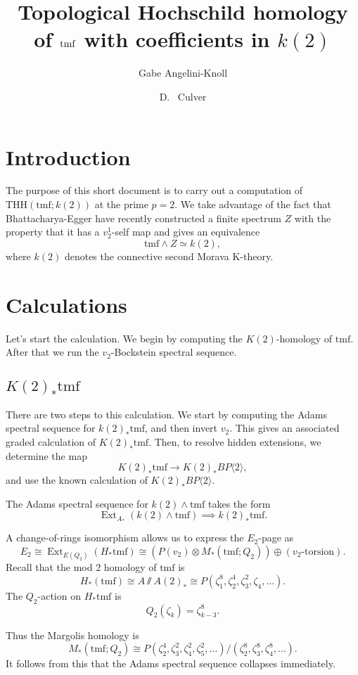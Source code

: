 \documentclass[12pt]{amsart}
\author{Gabe Angelini-Knoll}\address{Michigan State University, Lansing}
\author{D.~ Culver}\address{University of Illinois, Urbana-champaign}\email{dculver@illinois.edu}
\title{Topological Hochschild homology of $\tmf$ with coefficients in $k(2)$}
\newcommand{\mmod}{\! \sslash \!}
\newcommand{\bra}[1]{\langle #1 \rangle}
\newcommand{\br}[1]{\overline{#1}}
\newcommand{\tBP}[1]{BP\bra{#1}}
\newcommand{\tmf}{\mathrm{tmf}}
\newcommand{\THH}{\mathrm{THH}}
\DeclareMathOperator{\Ext}{Ext}
\def \AA0{\br{A \mmod A(0)}_*}
\def \AA2{A\mmod A(2)_*}
\theoremstyle{definition}
\numberwithin{equation}{section}
\numberwithin{figure}{section}
\begin{document}
\maketitle


\section{Introduction} 

The purpose of this short document is to carry out a computation of $\THH(\tmf; k(2))$ at the prime $p=2$. We take advantage of the fact that Bhattacharya-Egger have recently constructed a finite spectrum $Z$ with the property that it has a $v_2^1$-self map and gives an equivalence
\[
\tmf\wedge Z\simeq k(2),
\]
where $k(2)$ denotes the connective second Morava K-theory.

\section{Calculations}

Let's start the calculation. We begin by computing the $K(2)$-homology of $\tmf$. After that we run the $v_2$-Bockstein spectral sequence. 

\subsection{$K(2)_*\tmf$}

There are two steps to this calculation. We start by computing the Adams spectral sequence for $k(2)_*\tmf$, and then invert $v_2$. This gives an associated graded calculation of $K(2)_*\tmf$. Then, to resolve hidden extensions, we determine the map
\[
K(2)_*\tmf\to K(2)_*\tBP{2},
\]
and use the known calculation of $K(2)_*\tBP{2}$.

The Adams spectral sequence for $k(2)\wedge \tmf$ takes the form 
\[
\Ext_{A_*}(k(2)\wedge \tmf)\implies k(2)_*\tmf.
\]

A change-of-rings isomorphism allows us to express the $E_2$-page as 
\[
E_2\cong \Ext_{E(Q_2)}(H_*\tmf)\cong (P(v_2)\otimes M_*(\tmf;Q_2))\oplus (v_2\text{-torsion}).
\]
Recall that the mod 2 homology of $\tmf$ is 
\[
H_*(\tmf)\cong \AA2\cong P(\zeta_1^8, \zeta_2^4, \zeta_3^2, \zeta_4, \ldots).
\]
The $Q_2$-action on $H_*\tmf$ is 
\[
Q_2(\zeta_k) = \zeta_{k-3}^8.
\]

Thus the Margolis homology is 
\[
M_*(\tmf;Q_2)\cong P(\zeta_2^4, \zeta_3^2, \zeta_4^2, \zeta_5^2, \ldots)/(\zeta_2^8, \zeta_3^8, \zeta_4^8, \ldots).
\]
It follows from this that the Adams spectral sequence collapses immediately. 
\end{document}
